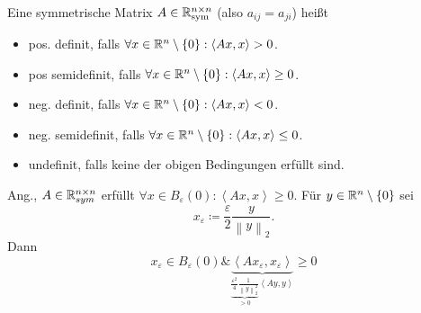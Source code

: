\begin{definition}
	Eine symmetrische Matrix $ A \in \mathbb{R} _{\text{sym} } ^{n \times n}  $ (also $ a_{ij} = a_{ji}  $) heißt
	\begin{itemize}
		\item pos. definit, falls $ \forall x \in \mathbb{R} ^n \setminus \left\{ 0 \right\} : \left< Ax, x \right> > 0 $.
		\item pos semidefinit, falls $ \forall x \in \mathbb{R} ^n \setminus \left\{ 0 \right\} : \left< Ax, x \right> \geq  0 $.
		\item neg. definit, falls $ \forall x \in \mathbb{R} ^n \setminus \left\{ 0 \right\} : \left< Ax, x \right> < 0 $.
		\item neg. semidefinit, falls $ \forall x \in \mathbb{R} ^n \setminus \left\{ 0 \right\} : \left< Ax, x \right> \leq  0 $.
		\item undefinit, falls keine der obigen Bedingungen erfüllt sind.
	\end{itemize}
\end{definition}

\begin{note}
	Ang., $ A \in \mathbb{R} _{sym} ^{n \times n}  $ erfüllt $ \forall x \in B_{\varepsilon}(0) : \left< Ax, x \right> \geq  0 $.
	Für $ y \in \mathbb{R} ^n \setminus \left\{ 0 \right\}  $ sei
	\[
		x_{\varepsilon } \coloneqq \frac{ \varepsilon }{ 2 } \frac{ y }{ \left\| y \right\| _2 } .
	\]
	Dann
	\[
		x_{\varepsilon } \in B_{\varepsilon}(0) \& \underbrace{ \left< Ax_\varepsilon , x_\varepsilon  \right> }_{ \underbrace{ \frac{ \varepsilon ^2}{ 4 } \frac{ 1 }{ \left\| y \right\| _2^2 } }_{>0} \left< Ay, y \right>  } \geq 0
	\]
\end{note}


